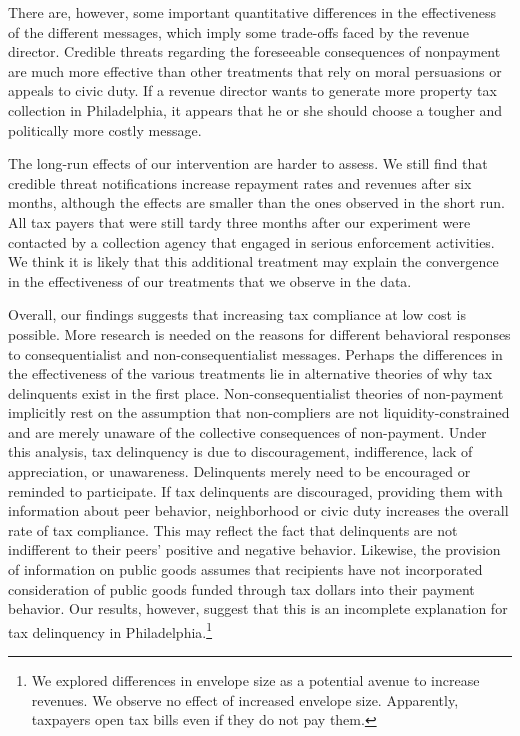 \documentclass[12pt]{article}
\begin{document}
There are, however, some important quantitative differences in the
effectiveness of the different messages, which imply some trade-offs
faced by the revenue director. Credible threats regarding the
foreseeable consequences of nonpayment are much more effective than
other treatments that rely on moral persuasions or appeals to civic
duty. If a revenue director wants to generate more property tax
collection in Philadelphia, it appears that he or she should choose a
tougher and politically more costly message.

The long-run effects of our intervention are harder to assess.  We
still find that credible threat notifications increase repayment rates
and revenues after six months, although the effects are smaller than
the ones observed in the short run.  All tax payers that were still
tardy three months after our experiment were contacted by a collection
agency that engaged in serious enforcement activities. We think it is
likely that this additional treatment may explain the convergence in
the effectiveness of our treatments that we observe in the data.

Overall, our findings suggests that increasing tax compliance at low
cost is possible. More research is needed on the reasons for different
behavioral responses to consequentialist and non-consequentialist
messages. Perhaps the differences in the effectiveness of the various
treatments lie in alternative theories of why tax delinquents exist in
the first place. Non-consequentialist theories of non-payment
implicitly rest on the assumption that non-compliers are not
liquidity-constrained and are merely unaware of the collective
consequences of non-payment. Under this analysis, tax delinquency is
due to discouragement, indifference, lack of appreciation, or
unawareness. Delinquents merely need to be encouraged or reminded to
participate. If tax delinquents are discouraged, providing them with
information about peer behavior, neighborhood or civic duty increases
the overall rate of tax compliance. This may reflect the fact that
delinquents are not indifferent to their peers' positive and negative
behavior. Likewise, the provision of information on public goods
assumes that recipients have not incorporated consideration of public
goods funded through tax dollars into their payment behavior.  Our
results, however, suggest that this is an incomplete explanation for
tax delinquency in Philadelphia.\footnote{We explored differences in
  envelope size as a potential avenue to increase revenues. We observe
  no effect of increased envelope size.  Apparently, taxpayers open
  tax bills even if they do not pay them.}
\end{document}
